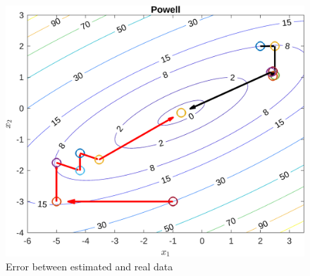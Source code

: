 \documentclass[10pt, a4paper]{article}
\begin{document}
\begin{figure}[H]
      \centering
      \includegraphics[width=\textwidth]{img01A_m02.png}
      \caption{Error between estimated and real data}
      \label{fig:e}
\end{figure}
\end{document}
